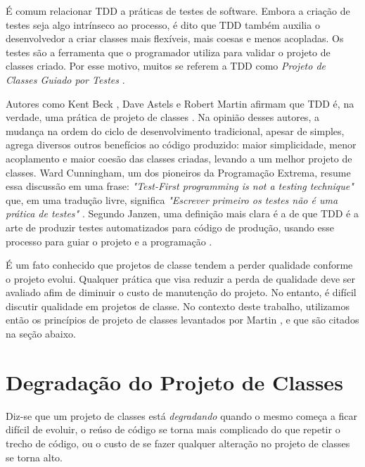 \documentclass[conference]{IEEEtran}
\begin{document}
É comum relacionar TDD a práticas de testes de software. 
Embora a criação de testes seja algo intrínseco ao processo, é dito que TDD também 
auxilia o desenvolvedor a criar classes mais flexíveis, mais coesas e
menos acopladas. Os testes são a ferramenta que o programador utiliza para
validar o projeto de classes criado. Por esse motivo, muitos se referem a TDD como
\textit{Projeto de Classes Guiado por Testes} \cite{tdd-taxonomy}.

Autores como Kent Beck \cite{aim-fire}, Dave Astels \cite{astels-tdd} e
Robert Martin \cite{bob-martin} afirmam que TDD é, na verdade, uma prática de
projeto de classes \cite{tdd-taxonomy} \cite{aim-fire}.
Na opinião desses autores, a mudança na ordem do ciclo de
desenvolvimento tradicional, apesar de simples, agrega diversos outros
benefícios ao código produzido: maior simplicidade, menor acoplamento e maior
coesão das classes criadas, levando a um melhor projeto de classes. 
Ward Cunningham, um dos pioneiros da Programação Extrema, resume essa 
discussão em uma frase: \textit{"Test-First programming is not a testing technique"} 
que, em uma tradução livre, significa \textit{"Escrever primeiro os testes
não é uma prática de testes"} \cite{aim-fire}.
Segundo Janzen, uma definição mais clara é a de que TDD é a arte de produzir testes
automatizados para código de produção, usando esse processo para guiar o 
projeto e a programação \cite{agilealliance-tdd} \cite{tdd-taxonomy}.

É um fato conhecido que projetos de classe tendem a perder qualidade conforme o projeto
evolui. Qualquer prática que visa reduzir a perda de qualidade deve ser avaliado afim
de diminuir o custo de manutenção do projeto. No entanto, é difícil discutir qualidade
em projetos de classe. No contexto deste trabalho, utilizamos então os princípios de projeto
de classes levantados por Martin \cite{bob-martin}, e que são citados na seção abaixo.

\section{Degradação do Projeto de Classes}

Diz-se que um projeto de classes está \textit{degradando}
quando o mesmo começa a ficar difícil de evoluir, o reúso de código se 
torna mais complicado do que repetir o trecho de código, ou o custo de se fazer 
qualquer alteração no projeto de classes se torna alto.
\end{document}
